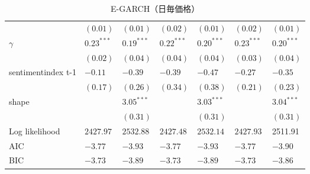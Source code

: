 \begin{landscape}
\begin{table}[]
\begin{tabular}{lllllll}
                   & $(0.01)$      & $(0.01)$      & $(0.02)$      & $(0.01)$      & $(0.02)$      & $(0.01)$      \\
$\gamma$           & $0.23^{***}$  & $0.19^{***}$  & $0.22^{***}$  & $0.20^{***}$  & $0.23^{***}$  & $0.20^{***}$  \\
                   & $(0.02)$      & $(0.04)$      & $(0.04)$      & $(0.04)$      & $(0.03)$      & $(0.04)$      \\
sentimentindex t-1 & $-0.11$       & $-0.39$       & $-0.39$       & $-0.47$       & $-0.27$       & $-0.35$       \\
                   & $(0.17)$      & $(0.26)$      & $(0.34)$      & $(0.38)$      & $(0.21)$      & $(0.23)$      \\
shape              &               & $3.05^{***}$  &               & $3.03^{***}$  &               & $3.04^{***}$  \\
                   &               & $(0.31)$      &               & $(0.31)$      &               & $(0.31)$      \\ \hline
Log likelihood     & $2427.97$     & $2532.88$     & $2427.48$     & $2532.14$     & $2427.93$     & 2511.91       \\
AIC                & $-3.77$       & $-3.93$       & $-3.77$       & $-3.93$       & $-3.77$       & −3.90         \\
BIC                & $-3.73$       & $-3.89$       & $-3.73$       & $-3.89$       & $-3.73$       & −3.86         \\ \hline

\end{tabular}
\caption{E-GARCH（日毎価格）}
\end{table}
\end{landscape}



